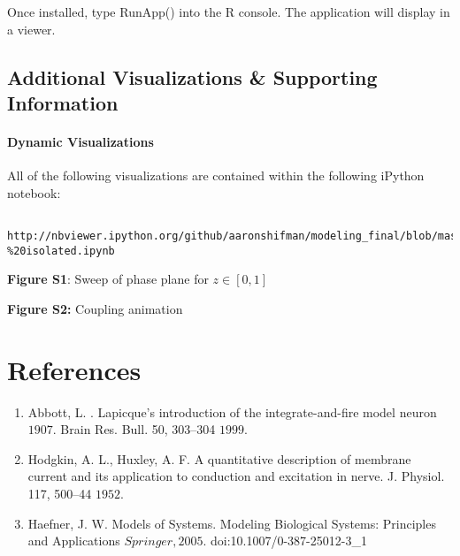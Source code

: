 \documentclass[11pt]{report}
\begin{document}
Once installed, type RunApp() into the R console. The application will display in a viewer.


\section{Additional Visualizations \& Supporting Information} %
\label{sec:web_app}


\subsubsection{Dynamic Visualizations} %
\label{ssub:dynamic_visualizations}

All of the following visualizations are contained within the following iPython notebook: 

\begin{lstlisting}
  
http://nbviewer.ipython.org/github/aaronshifman/modeling_final/blob/master/ipynb/python%20model%20-%20isolated.ipynb

\end{lstlisting}


\textbf{Figure S1}: Sweep of phase plane for $z \in [0,1]$

\textbf{Figure S2:} Coupling animation



\chapter{References} %
\label{sec:references}

\begin{enumerate}
  \item Abbott, L. . Lapicque’s introduction of the integrate-and-fire model neuron \(1907\). Brain Res. Bull. 50, 303–304 \(1999\).
  \item Hodgkin, A. L., Huxley, A. F. A quantitative description of membrane current and its application to conduction and excitation in nerve. J. Physiol. 117, 500–44 \(1952\).
  \item Haefner, J. W. Models of Systems. Modeling Biological Systems: Principles and Applications \(Springer, 2005\). doi:10.1007/0-387-25012-3\_1
\end{enumerate}


\end{document}

